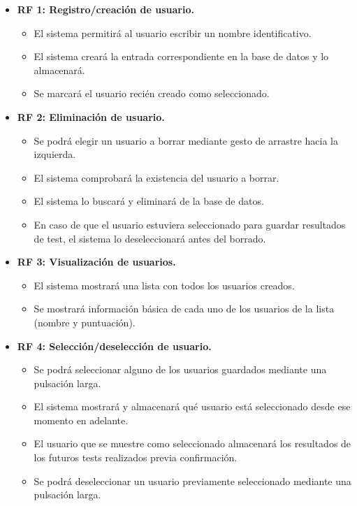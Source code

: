 \begin{itemize}
    \item \textbf{RF 1: Registro/creación de usuario.}
    \begin{itemize}
        \item El sistema permitirá al usuario escribir un nombre identificativo.
        \item El sistema creará la entrada correspondiente en la base de datos y lo almacenará.
        \item Se marcará el usuario recién creado como seleccionado.
    \end{itemize}
    
    \item \textbf{RF 2: Eliminación de usuario.} 
    \begin{itemize}
        \item Se podrá elegir un usuario a borrar mediante gesto de arrastre hacia la izquierda.
        \item El sistema comprobará la existencia del usuario a borrar.
        \item El sistema lo buscará y eliminará de la base de datos.
        \item En caso de que el usuario estuviera seleccionado para guardar resultados de test, el sistema lo deseleccionará antes del borrado.
    \end{itemize}
    
    \item \textbf{RF 3: Visualización de usuarios.} 
    \begin{itemize}
        \item El sistema mostrará una lista con todos los usuarios creados.
        \item Se mostrará información básica de cada uno de los usuarios de la lista (nombre y puntuación).
    \end{itemize}
    
    \item \textbf{RF 4: Selección/deselección de usuario.} 
    \begin{itemize}
        \item Se podrá seleccionar alguno de los usuarios guardados mediante una pulsación larga.
        \item El sistema mostrará y almacenará qué usuario está seleccionado desde ese momento en adelante.
        \item El usuario que se muestre como seleccionado almacenará los resultados de los futuros tests realizados previa confirmación.
        \item Se podrá deseleccionar un usuario previamente seleccionado mediante una pulsación larga.
    \end{itemize}
    

\end{itemize}
